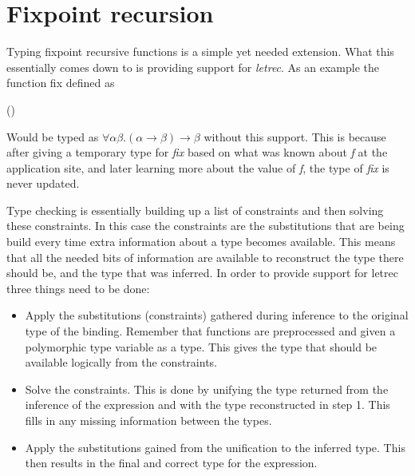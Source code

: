 \documentclass[twoside, titlepage, openright, a4paper]{book}
\newcommand{\Varid}[1]{\mathit{#1}}
\def\resethooks{%
  \global\let\SaveRestoreHook\empty
  \global\let\ColumnHook\empty}
\let\hspre\empty
\let\hspost\empty
\begin{document}
\begin{prooftree}
\end{prooftree} 
\section{Fixpoint recursion}
Typing fixpoint recursive functions is a simple yet needed extension. What this essentially comes down to is providing support for \emph{letrec}. As an example the function fix defined as

\begin{hscode}\SaveRestoreHook
\column{B}{@{}>{\hspre}l<{\hspost}@{}}%
\column{E}{@{}>{\hspre}l<{\hspost}@{}}%
\>[B]{}\Varid{fix}\;\Varid{f}\mathrel{=}\Varid{f}\;(\Varid{fix}\;\Varid{f}){}\<[E]%
\ColumnHook
\end{hscode}\resethooks

Would be typed as $\forall \alpha \beta. (\alpha \rightarrow \beta) \rightarrow \beta$ without this support. This is because after giving a temporary type for \emph{fix} based on what was known about \emph{f} at the application site, and later learning more about the value of \emph{f}, the type of \emph{fix} is never updated.

Type checking is essentially building up a list of constraints and then solving these constraints. In this case the constraints are the substitutions that are being build every time extra information about a type becomes available.
This means that all the needed bits of information are available to reconstruct the type there should be, and the type that was inferred. In order to provide support for letrec three things need to be done:

\begin{itemize}
\item Apply the substitutions (constraints) gathered during inference to the original type of the binding. Remember that functions are preprocessed and given a polymorphic type variable as a type. This gives the type that should be available logically from the constraints.
\item Solve the constraints. This is done by unifying the type returned from the inference of the expression and with the type reconstructed in step 1. This fills in any missing information between the types.
\item Apply the substitutions gained from the unification to the inferred type. This then results in the final and correct type for the expression.
\end{itemize}
\end{document}

